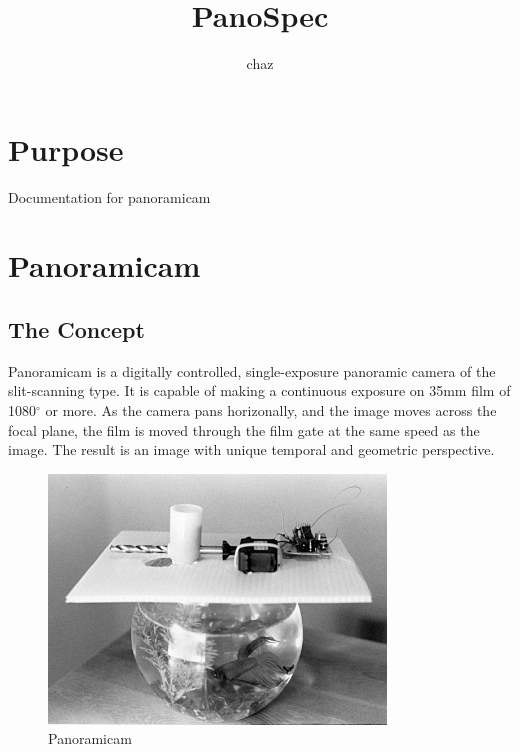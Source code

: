 \documentclass[dvips,12pt]{article}
\title{PanoSpec}
\author{chaz}
\begin{document}
\frenchspacing


\section{Purpose}
Documentation for panoramicam

\tableofcontents
\listoffigures


\section{Panoramicam}

\subsection{The Concept}
Panoramicam is a digitally controlled, single-exposure 
panoramic camera of the slit-scanning type. It is capable of making a
continuous exposure on 35mm film of 1080$^\circ$ or more. As the camera
pans horizonally, and the image
moves across the focal plane, the film is moved through the film gate at
the same speed as the image. The result is an image with unique temporal
and geometric perspective.

\begin{figure}[h]
    \includegraphics[width=0.8\textwidth]{test}
    \caption{Panoramicam}
    \label{fig:Panoramicam}
\end{figure}
\end{document}

